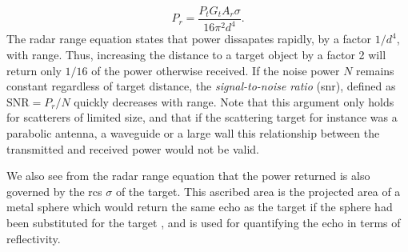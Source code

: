 \begin{equation}
	P_r
	= \frac{P_t G_t A_r \sigma}{16\pi^2 d^4}.
\end{equation}
The radar range equation states that power dissapates rapidly, by a factor $1/d^4$, with range. Thus, increasing the distance to a target object by a factor 2 will return only $1/16$ of the power otherwise received. If the noise power $N$ remains constant regardless of target distance, the \emph{signal-to-noise ratio} (\gls{snr}), defined as $\text{SNR} = P_r/N$ quickly decreases with range. Note that this argument only holds for scatterers of limited size, and that if the scattering target for instance was a parabolic antenna, a waveguide or a large wall this relationship between the transmitted and received power would not be valid. 

We also see from the radar range equation that the power returned is also governed by the \gls{rcs} $\sigma$ of the target. This ascribed area is the projected area of a metal sphere which would return the same echo as the target if the sphere had been substituted for the target \citep{skolnik_2009}, and is used for quantifying the echo in terms of reflectivity.  









